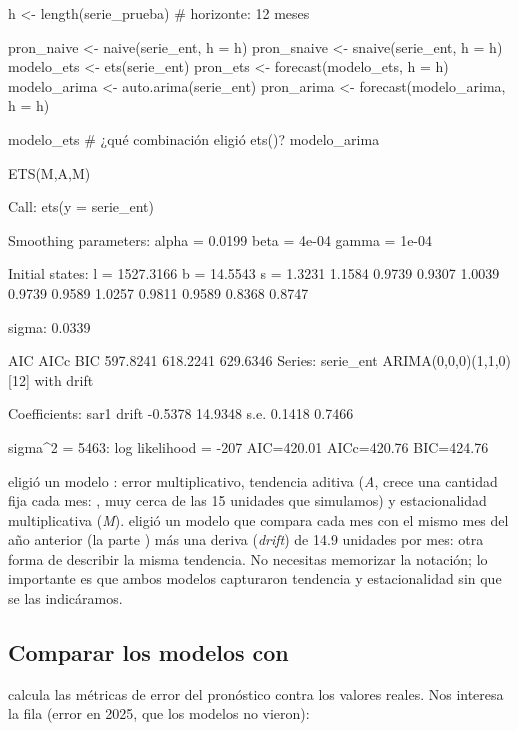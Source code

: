 \begin{rcode}
h <- length(serie_prueba)   # horizonte: 12 meses

pron_naive  <- naive(serie_ent, h = h)
pron_snaive <- snaive(serie_ent, h = h)
modelo_ets  <- ets(serie_ent)
pron_ets    <- forecast(modelo_ets, h = h)
modelo_arima <- auto.arima(serie_ent)
pron_arima  <- forecast(modelo_arima, h = h)

modelo_ets     # ¿qué combinación eligió ets()?
modelo_arima
\end{rcode}

\begin{rsalida}
ETS(M,A,M) 

Call:
 ets(y = serie_ent) 

  Smoothing parameters:
    alpha = 0.0199 
    beta  = 4e-04 
    gamma = 1e-04 

  Initial states:
    l = 1527.3166 
    b = 14.5543 
    s = 1.3231 1.1584 0.9739 0.9307 1.0039 0.9739
           0.9589 1.0257 0.9811 0.9589 0.8368 0.8747

  sigma:  0.0339

     AIC     AICc      BIC 
597.8241 618.2241 629.6346 
Series: serie_ent 
ARIMA(0,0,0)(1,1,0)[12] with drift 

Coefficients:
         sar1    drift
      -0.5378  14.9348
s.e.   0.1418   0.7466

sigma^2 = 5463:  log likelihood = -207
AIC=420.01   AICc=420.76   BIC=424.76
\end{rsalida}

 eligió un modelo : error multiplicativo,
tendencia aditiva (\emph{A}, crece una cantidad fija cada mes: , muy cerca de las 15 unidades que simulamos) y estacionalidad
multiplicativa (\emph{M}).  eligió un modelo que compara
cada mes con el mismo mes del año anterior (la parte ) más
una deriva (\emph{drift}) de 14.9 unidades por mes: otra forma de describir la
misma tendencia. No necesitas memorizar la notación; lo importante es que
ambos modelos capturaron tendencia y estacionalidad sin que se las
indicáramos.

\subsection{Comparar los modelos con \texorpdfstring{}{accuracy()}}

 calcula las métricas de error del pronóstico contra los
valores reales. Nos interesa la fila  (error en 2025, que los
modelos no vieron):

